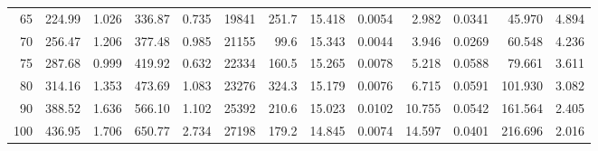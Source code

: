 \documentclass[10pt]{article}
\begin{document}
{\begin{tabular}{|r|rr|rr|rr|rr|rr|r|r|}
       65 &       224.99 &        1.026 &       336.87 &        0.735 &        19841 &        251.7 &       15.418 &       0.0054 &        2.982 &       0.0341 &       45.970 &        4.894 \\
       70 &       256.47 &        1.206 &       377.48 &        0.985 &        21155 &         99.6 &       15.343 &       0.0044 &        3.946 &       0.0269 &       60.548 &        4.236 \\
       75 &       287.68 &        0.999 &       419.92 &        0.632 &        22334 &        160.5 &       15.265 &       0.0078 &        5.218 &       0.0588 &       79.661 &        3.611 \\
       80 &       314.16 &        1.353 &       473.69 &        1.083 &        23276 &        324.3 &       15.179 &       0.0076 &        6.715 &       0.0591 &      101.930 &        3.082 \\
       90 &       388.52 &        1.636 &       566.10 &        1.102 &        25392 &        210.6 &       15.023 &       0.0102 &       10.755 &       0.0542 &      161.564 &        2.405 \\
      100 &       436.95 &        1.706 &       650.77 &        2.734 &        27198 &        179.2 &       14.845 &       0.0074 &       14.597 &       0.0401 &      216.696 &        2.016 \\
\hline
\end{tabular}
}







\pagebreak
\end{document}
